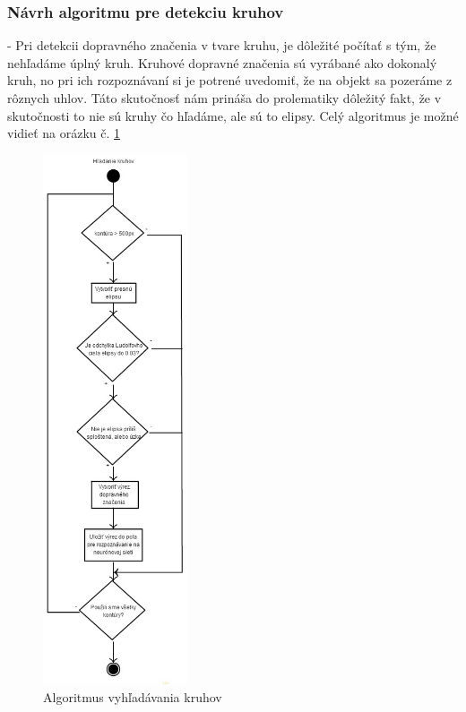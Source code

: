 \documentclass[12pt]{article}
\begin{document}
\subsubsection{Návrh algoritmu pre detekciu kruhov}
- Pri detekcii dopravného značenia v tvare kruhu, je dôležité počítať s tým, že nehľadáme úplný kruh. Kruhové dopravné značenia sú vyrábané ako dokonalý kruh,
no pri ich rozpoznávaní si je potrené uvedomiť, že na objekt sa pozeráme z rôznych uhlov. Táto skutočnosť nám prináša do prolematiky dôležitý fakt,
že v skutočnosti to nie sú kruhy čo hľadáme, ale sú to elipsy. Celý algoritmus je možné vidieť na orázku č. \ref{hladanie_kruhov}
\linebreak
\linebreak
\begin{figure}[p]
\centering
\includegraphics[width=0.38\textwidth,natwidth=318,natheight=1164]{hladanie_kruhov.jpg}
\vspace{-20pt}
\caption{Algoritmus vyhľadávania kruhov}
\vspace{-10pt}
\label{hladanie_kruhov}
\end{figure}
\end{document}
